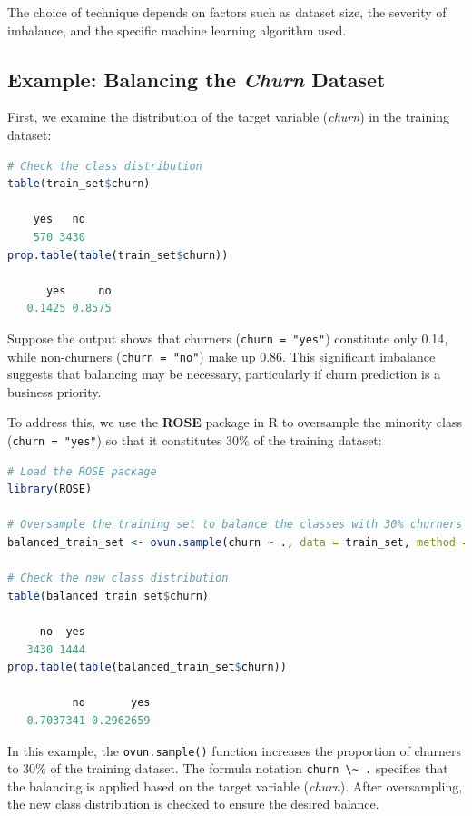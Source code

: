 \documentclass[
]{book}
\newcommand{\passthrough}[1]{#1}
\theoremstyle{definition}
\theoremstyle{definition}
\theoremstyle{definition}
\theoremstyle{definition}
\theoremstyle{remark}
\begin{document}
The choice of technique depends on factors such as dataset size, the severity of imbalance, and the specific machine learning algorithm used.

\subsection*{\texorpdfstring{Example: Balancing the \emph{Churn} Dataset}{Example: Balancing the Churn Dataset}}\label{example-balancing-the-churn-dataset}

First, we examine the distribution of the target variable (\emph{churn}) in the training dataset:

\begin{lstlisting}[language=R]
# Check the class distribution
table(train_set$churn)
   
    yes   no 
    570 3430
prop.table(table(train_set$churn))
   
      yes     no 
   0.1425 0.8575
\end{lstlisting}

Suppose the output shows that churners (\passthrough{\lstinline!churn = "yes"!}) constitute only 0.14, while non-churners (\passthrough{\lstinline!churn = "no"!}) make up 0.86. This significant imbalance suggests that balancing may be necessary, particularly if churn prediction is a business priority.

To address this, we use the \textbf{ROSE} package in R to oversample the minority class (\passthrough{\lstinline!churn = "yes"!}) so that it constitutes 30\% of the training dataset:

\begin{lstlisting}[language=R]
# Load the ROSE package
library(ROSE)

# Oversample the training set to balance the classes with 30% churners
balanced_train_set <- ovun.sample(churn ~ ., data = train_set, method = "over", p = 0.3)$data

# Check the new class distribution
table(balanced_train_set$churn)
   
     no  yes 
   3430 1444
prop.table(table(balanced_train_set$churn))
   
          no       yes 
   0.7037341 0.2962659
\end{lstlisting}

In this example, the \passthrough{\lstinline!ovun.sample()!} function increases the proportion of churners to 30\% of the training dataset. The formula notation \passthrough{\lstinline!churn \~ .!} specifies that the balancing is applied based on the target variable (\emph{churn}). After oversampling, the new class distribution is checked to ensure the desired balance.
\end{document}
